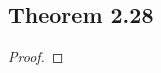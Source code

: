 \documentclass[../../main.tex]{subfiles}
\begin{document}
\subsection{Theorem 2.28}
\begin{wts}

\end{wts}
\begin{proof}

\end{proof}
\end{document}
